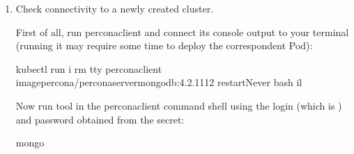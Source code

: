 \documentclass[letterpaper,10pt,english]{sphinxmanual}
\begin{document}
\begin{enumerate}
Use  command to see the list of Secrets objects (by default Secrets object you are interested in has  name). Then  will return the YAML file with generated secrets, including the 
and  strings, which should look as follows:

\begin{sphinxVerbatim}[commandchars=\\\{\}]
   
   
\end{sphinxVerbatim}

Here the actual password is base64\sphinxhyphen{}encoded, and  will bring it back to a human\sphinxhyphen{}readable form.

\item {} 
Check connectivity to a newly created cluster.

First of all, run percona\sphinxhyphen{}client and connect its console output to your
terminal (running it may require some time to deploy the correspondent Pod):

\begin{sphinxVerbatim}[commandchars=\\\{\}]
kubectl run \PYGZhy{}i \PYGZhy{}\PYGZhy{}rm \PYGZhy{}\PYGZhy{}tty percona\PYGZhy{}client \PYGZhy{}\PYGZhy{}imagepercona/percona\PYGZhy{}server\PYGZhy{}mongodb:4.2.11\PYGZhy{}12 \PYGZhy{}\PYGZhy{}restartNever \PYGZhy{}\PYGZhy{} bash \PYGZhy{}il
\end{sphinxVerbatim}

Now run  tool in the percona\sphinxhyphen{}client command shell using the login
(which is ) and password obtained from the secret:

\begin{sphinxVerbatim}[commandchars=\\\{\}]
mongo 
\end{sphinxVerbatim}

\end{enumerate}
\end{document}

